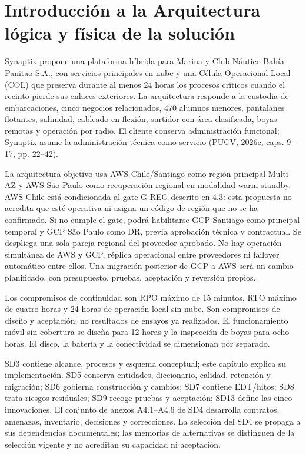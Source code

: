 \documentclass[11pt,letterpaper]{report}
\begin{document}
\tableofcontents
\clearpage
\setcounter{chapter}{3}
\chapter{Introducción a la Arquitectura lógica y física de la solución}
Synaptix propone una plataforma híbrida para Marina y Club Náutico Bahía Panitao S.A., con servicios principales en nube y una Célula Operacional Local (COL) que preserva durante al menos 24 horas los procesos críticos cuando el recinto pierde sus enlaces exteriores. La arquitectura responde a la custodia de embarcaciones, cinco negocios relacionados, 470 alumnos menores, pantalanes flotantes, salinidad, cableado en flexión, surtidor con área clasificada, boyas remotas y operación por radio. El cliente conserva administración funcional; Synaptix asume la administración técnica como servicio (PUCV, 2026c, caps. 9--17, pp. 22--42).

La arquitectura objetivo usa AWS Chile/Santiago como región principal Multi-AZ y AWS São Paulo como recuperación regional en modalidad warm standby. AWS Chile está condicionada al gate G-REG descrito en 4.3: esta propuesta no acredita que esté operativa ni asigna un código de región que no se ha confirmado. Si no cumple el gate, podrá habilitarse GCP Santiago como principal temporal y GCP São Paulo como DR, previa aprobación técnica y contractual. Se despliega una sola pareja regional del proveedor aprobado. No hay operación simultánea de AWS y GCP, réplica operacional entre proveedores ni failover automático entre ellos. Una migración posterior de GCP a AWS será un cambio planificado, con presupuesto, pruebas, aceptación y reversión propios.

Los compromisos de continuidad son RPO máximo de 15 minutos, RTO máximo de cuatro horas y 24 horas de operación local sin nube. Son compromisos de diseño y aceptación; no resultados de ensayos ya realizados. El funcionamiento móvil sin cobertura se diseña para 12 horas y la inspección de boyas para ocho horas. El disco, la batería y la conectividad se dimensionan por separado.

SD3 contiene alcance, procesos y esquema conceptual; este capítulo explica su implementación. SD5 conserva entidades, diccionario, calidad, retención y migración; SD6 gobierna construcción y cambios; SD7 contiene EDT/hitos; SD8 trata riesgos residuales; SD9 recoge pruebas y aceptación; SD13 define las cinco innovaciones. El conjunto de anexos A4.1--A4.6 de SD4 desarrolla contratos, amenazas, inventario, decisiones y correcciones. La selección del SD4 se propaga a sus dependencias documentales; las memorias de alternativas se distinguen de la selección vigente y no acreditan su capacidad ni aceptación.
\end{document}
